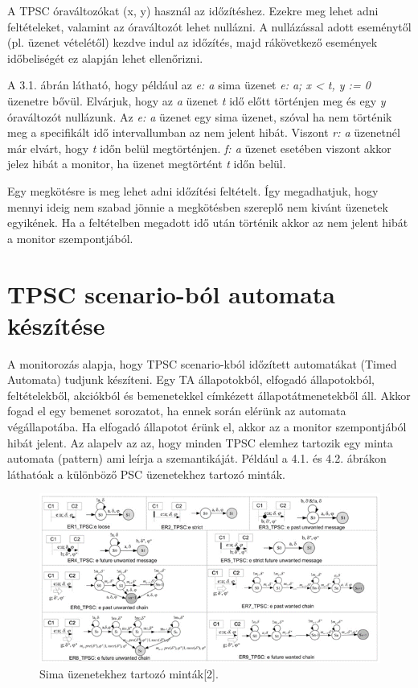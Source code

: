 A TPSC óraváltozókat (x, y) használ az időzítéshez.
Ezekre meg lehet adni feltételeket, valamint az óraváltozót lehet nullázni.
A nullázással adott eseménytől (pl. üzenet vételétől) kezdve indul az időzítés, majd rákövetkező események időbeliségét ez alapján lehet ellenőrizni.

A 3.1. ábrán látható, hogy például az \textit{e: a} sima üzenet \textit{e: a; x < t, y := 0} üzenetre bővül.
Elvárjuk, hogy az \textit{a} üzenet \textit{t} idő előtt történjen meg és egy \textit{y} óraváltozót nullázunk.
Az \textit{e: a} üzenet egy sima üzenet, szóval ha nem történik meg a specifikált idő intervallumban az nem jelent hibát.
Viszont \textit{r: a} üzenetnél már elvárt, hogy \textit{t} időn belül megtörténjen. \textit{f: a} üzenet esetében viszont akkor jelez hibát a monitor, ha üzenet megtörtént \textit{t} időn belül.

Egy megkötésre is meg lehet adni időzítési feltételt.
Így megadhatjuk, hogy mennyi ideig nem szabad jönnie a megkötésben szereplő nem kivánt üzenetek egyikének.
Ha a feltételben megadott idő után történik akkor az nem jelent hibát a monitor szempontjából.

\clearpage\section{TPSC scenario-ból automata készítése}

A monitorozás alapja, hogy TPSC scenario-kból időzített automatákat (Timed Automata) tudjunk készíteni.
Egy TA állapotokból, elfogadó állapotokból, feltételekből, akciókból és bemenetekkel címkézett állapotátmenetekből áll.
Akkor fogad el egy bemenet sorozatot, ha ennek során elérünk az automata végállapotába.
Ha elfogadó állapotot érünk el, akkor az a monitor szempontjából hibát jelent.
Az alapelv az az, hogy minden TPSC elemhez tartozik egy minta automata (pattern) ami leírja a szemantikáját.
Például a 4.1. és 4.2. ábrákon láthatóak a különböző PSC üzenetekhez tartozó minták.

\begin{figure}[!ht]
    \centering
    \includegraphics[width=150mm, keepaspectratio]{figures/5abra.png}
    \caption{Sima üzenetekhez tartozó minták[2].}
\end{figure}

